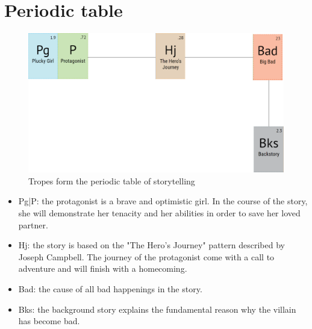 \section{Periodic table}

\begin{figure}[H]
  \centering
  \includegraphics[width=14cm]{Images/SVG/Exported/periodicTable}
  \caption{Tropes form the periodic table of storytelling}
\end{figure}

\begin{itemize}
\item Pg|P: the protagonist is a brave and optimistic girl. In the course of the story, she will demonstrate her tenacity and her abilities in order to save her loved partner.
\item Hj: the story is based on the "The Hero's Journey" pattern described by Joseph Campbell. The journey of the protagonist come with a call to adventure and will finish with a homecoming.
\item Bad: the cause of all bad happenings in the story.
\item Bks: the background story explains the fundamental reason why the villain has become bad.
\end{itemize}
